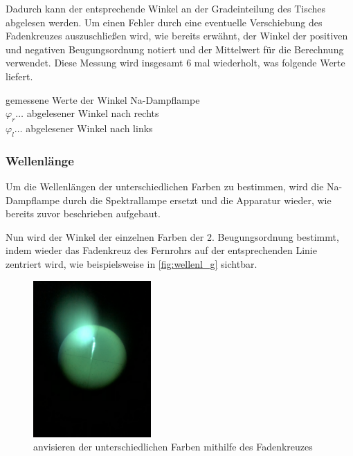 \documentclass[11pt,ngerman]{scrartcl}
\begin{document}
Dadurch kann der entsprechende Winkel an der Gradeinteilung des Tisches
abgelesen werden. Um einen Fehler durch eine eventuelle Verschiebung des
Fadenkreuzes auszuschließen wird, wie bereits erwähnt, der Winkel der positiven
und negativen Beugungsordnung notiert und der Mittelwert für die Berechnung
verwendet. Diese Messung wird insgesamt 6 mal wiederholt, was folgende Werte
liefert.

\begin{table}[H]
	\caption{gemessene Werte der Winkel Na-Dampflampe \\ $\varphi_r \dots$ abgelesener Winkel nach rechts \\ $\varphi_l \dots$ abgelesener Winkel nach links}
	\label{tab:messwinkelnadampf}
	\centering
	
\end{table}

\newpage

\subsubsection{Wellenlänge}

Um die Wellenlängen der unterschiedlichen Farben zu bestimmen, wird die Na-Dampflampe durch die Spektrallampe ersetzt und die Apparatur wieder, wie bereits zuvor beschrieben aufgebaut.

Nun wird der Winkel der einzelnen Farben der 2. Beugungsordnung bestimmt, indem wieder das Fadenkreuz des Fernrohrs auf der entsprechenden Linie zentriert wird, wie beispielsweise in \autoref{fig:wellenl_g} sichtbar.

\begin{figure}[H]
	\begin{center}
		\includegraphics[angle=-90,width=0.4\textwidth]{wellenl_g}
	\end{center}
	\caption{anvisieren der unterschiedlichen Farben mithilfe des Fadenkreuzes}
	\label{fig:wellenl_g}
\end{figure}
\end{document}
